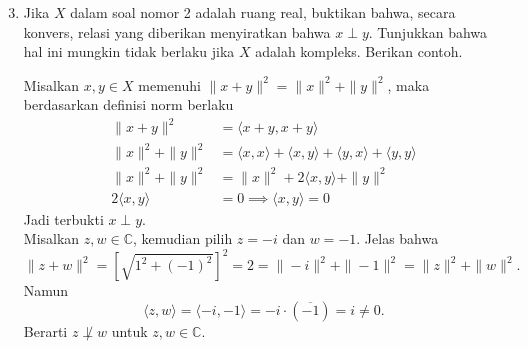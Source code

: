 \documentclass{article}
\theoremstyle{definition}
\newcommand{\C}{\mathbb{C}}
\begin{document}
\pagestyle{fancy}

\begin{enumerate}
  \setcounter{enumi}{2}
  \item Jika $X$ dalam soal nomor 2 adalah ruang real, buktikan bahwa, secara konvers, relasi yang diberikan menyiratkan bahwa $x \perp y$. Tunjukkan bahwa hal ini mungkin tidak berlaku jika $X$ adalah kompleks. Berikan contoh.
  \begin{solution}
    Misalkan $x,y\in X$ memenuhi $\|x+y\|^2=\|x\|^2+\|y\|^2$, maka berdasarkan definisi norm berlaku
    \begin{align*}
      \|x+y\|^2&=\langle x+y, x+y \rangle\\
      \|x\|^2+\|y\|^2&=\langle x,x \rangle+\langle x, y \rangle+\langle y,x \rangle+\langle y,y \rangle\\
      \|x\|^2+\|y\|^2&=\|x\|^2+2\langle x,y \rangle+\|y\|^2\\
      2\langle x,y \rangle&=0\implies \langle x,y \rangle=0
    \end{align*}
    Jadi terbukti $x\perp y$.\\

    Misalkan $z,w\in \C$, kemudian pilih $z=-i$ dan $w=-1$. Jelas bahwa
    \[
    \|z+w\|^2=\left[\sqrt{1^2+(-1)^2}\right]^2=2=\|-i\|^2+\|-1\|^2=\|z\|^2+\|w\|^2.
    \]
    Namun 
    \[
    \langle z,w \rangle=\langle -i,-1 \rangle=-i\cdot(\overline{-1})=i\neq 0.
    \]
    Berarti $z\not\perp w$ untuk $z,w\in \C$.
  \end{solution}


\end{enumerate}
\end{document}
